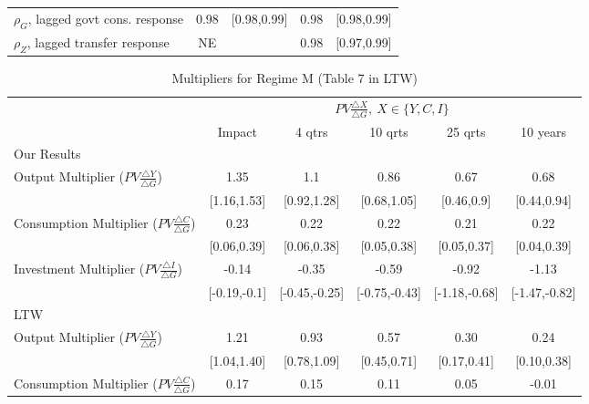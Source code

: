 \documentclass[letterpaper,12pt]{article}%
\begin{document}
\begin{table}[H]
\begin{threeparttable}
\begin{tabular}{l c c  c c}
			\quad $\rho_G$, lagged govt cons. response & 0.98& [0.98,0.99] & 0.98& [0.98,0.99] \\
			\quad $\rho_Z$, lagged transfer response & NE&  & 0.98 & [0.97,0.99] \\
						\bottomrule   
		\end{tabular}
		\begin{tablenotes}
			\item %
		\end{tablenotes}
		\label{tab:RWMH_para}
	\end{threeparttable}
\end{table}

\begin{table}[H]
	\centering
	\begin{threeparttable}
		\caption{Multipliers for Regime M (Table 7 in LTW)}
		\begin{tabular}{l c c c c c}
			\toprule
			& \multicolumn{5}{c}{$PV \frac{\triangle X}{\triangle G} , \ X \in \{Y,C,I\}$}\\
			\cmidrule{2-6}
			& Impact & 4 qtrs & 10 qrts & 25 qrts & 10 years \\
			\midrule
		    Our Results&     &   &  &   &   \\
			\quad Output Multiplier ($PV \frac{ \triangle Y}{\triangle G}$)&  1.35 & 1.1 & 0.86 & 0.67 & 0.68 \\
			\quad &   [1.16,1.53] & [0.92,1.28] & [0.68,1.05] & [0.46,0.9] & [0.44,0.94] \\
			\quad Consumption Multiplier ($PV \frac{ \triangle C}{\triangle G}$)&  0.23 & 0.22 & 0.22 & 0.21 & 0.22\\
			\quad &   [0.06,0.39] & [0.06,0.38] & [0.05,0.38] & [0.05,0.37] & [0.04,0.39] \\
			\quad Investment Multiplier ($PV \frac{ \triangle I}{\triangle G}$)&  -0.14 & -0.35 & -0.59 & -0.92 & -1.13 \\
			\quad &   [-0.19,-0.1] & [-0.45,-0.25] & [-0.75,-0.43] & [-1.18,-0.68] & [-1.47,-0.82] \\
			LTW&     &   &  &   &   \\
			\quad Output Multiplier ($PV \frac{ \triangle Y}{\triangle G}$)&  1.21 & 0.93 & 0.57 & 0.30 & 0.24 \\
			\quad &   [1.04,1.40] & [0.78,1.09] & [0.45,0.71] & [0.17,0.41] & [0.10,0.38] \\
			\quad Consumption Multiplier ($PV \frac{ \triangle C}{\triangle G}$)&  0.17 & 0.15 & 0.11 & 0.05 & -0.01\\

\end{tabular}
\end{threeparttable}
\end{table}
\end{document}
